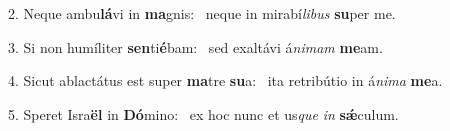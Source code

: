 2. Neque ambu\textbf{lá}vi in \textbf{ma}gnis: \ast\  neque in mirabí\textit{li}\textit{bus} \textbf{su}per me.\

3. Si non humíliter \textbf{sen}ti\textbf{é}bam: \ast\  sed exaltávi á\textit{ni}\textit{mam} \textbf{me}am.\

4. Sicut ablactátus est super \textbf{ma}tre \textbf{su}a: \ast\  ita retribútio in á\textit{ni}\textit{ma} \textbf{me}a.\

5. Speret Isra\textbf{ël} in \textbf{Dó}mino: \ast\  ex hoc nunc et us\textit{que} \textit{in} \textbf{sǽ}culum.\

